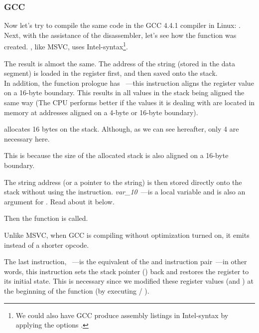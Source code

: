 \subsubsection{GCC}

Now let's try to compile the same \CCpp code in the GCC 4.4.1 compiler in Linux: .
Next, with the assistance of the \IDA disassembler, let's see how the \main function was created.
\IDA, like MSVC, uses Intel-syntax\footnote{We could also have GCC produce assembly listings in Intel-syntax by applying the options .}.



The result is almost the same.
The address of the  string (stored in the data segment) is loaded in the \EAX register first, and then saved onto the stack. \\
In addition, the function prologue has ~---this
instruction aligns the \ESP register value on a 16-byte boundary.
This results in all values in the stack being aligned the same way (The CPU performs better if the values it is dealing with are located in memory at addresses aligned
on a 4-byte or 16-byte boundary).

 allocates 16 bytes on the stack. Although, as we can see hereafter, only 4 are necessary here.

This is because the size of the allocated stack is also aligned on a 16-byte boundary.

The string address (or a pointer to the string) is then stored directly onto the stack without using the \PUSH instruction.
\emph{var\_10}~---is a local variable and is also an argument for \printf{}.
Read about it below.

Then the \printf function is called.

Unlike MSVC, when GCC is compiling without optimization turned on, it emits  instead of a shorter opcode.

The last instruction, \LEAVE~---is the equivalent of the  and  instruction pair~---in other words, this instruction sets the \gls{stack pointer} (\ESP) back and restores the \EBP register to its initial state.
This is necessary since we modified these register values (\ESP and \EBP) at the beginning of the function (by executing  / ).

